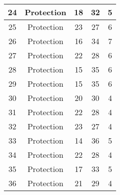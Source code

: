 \documentclass[results.tex]{subfiles}
\begin{document}
\begin{center}
\begin{tabular}{| c || c | c | c | c |}
            \hline
            24                      & Protection                   & 18                     & 32                      & 5                    \\
            \hline
            25                      & Protection                   & 23                     & 27                      & 6                    \\
            \hline
            26                      & Protection                   & 16                     & 34                      & 7                    \\
            \hline
            27                      & Protection                   & 22                     & 28                      & 6                    \\
            \hline
            28                      & Protection                   & 15                     & 35                      & 6                    \\
            \hline
            29                      & Protection                   & 15                     & 35                      & 6                    \\
            \hline
            30                      & Protection                   & 20                     & 30                      & 4                    \\
            \hline
            31                      & Protection                   & 22                     & 28                      & 4                    \\
            \hline
            32                      & Protection                   & 23                     & 27                      & 4                    \\
            \hline
            33                      & Protection                   & 14                     & 36                      & 5                    \\
            \hline
            34                      & Protection                   & 22                     & 28                      & 4                    \\
            \hline
            35                      & Protection                   & 17                     & 33                      & 5                    \\
            \hline
            36                      & Protection                   & 21                     & 29                      & 4                    \\

\end{tabular}
\end{center}
\end{document}
